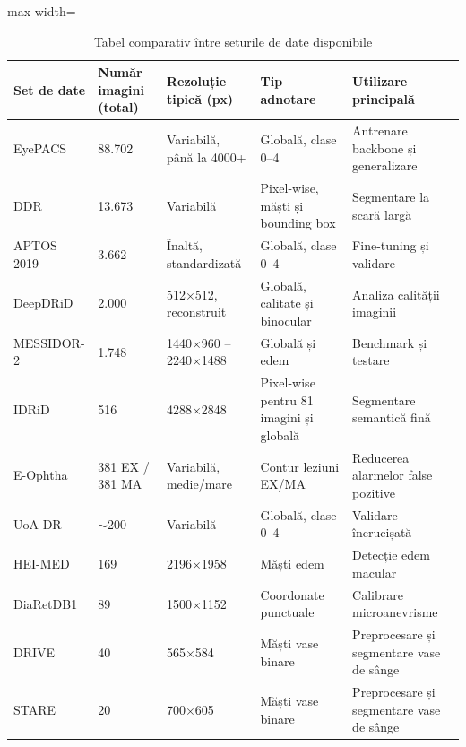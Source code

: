 \documentclass[12pt, a4paper, twoside, romanian]{teza-upb}
\begin{document}
\begin{itemize}
\begin{itemize}
            \begin{table}[H]
            \centering
            \small
            \caption{Tabel comparativ între seturile de date disponibile}
            \label{tab:datasets-comparativ}
            \begin{adjustbox}{max width=\textwidth}
            \begin{tabular}{|p{2.6cm}|p{2.3cm}|p{3cm}|p{3.8cm}|p{4cm}|}
            \hline
            \textbf{Set de date} & \textbf{Număr imagini (total)} & \textbf{Rezoluție tipică (px)} & \textbf{Tip adnotare} & \textbf{Utilizare principală} \\
            \hline
            EyePACS & 88.702 & Variabilă, până la 4000+ & Globală, clase 0--4 & Antrenare backbone și generalizare \\
            \hline
            DDR & 13.673 & Variabilă & Pixel-wise, măști și bounding box & Segmentare la scară largă \\
            \hline
            APTOS 2019 & 3.662 & Înaltă, standardizată & Globală, clase 0--4 & Fine-tuning și validare \\
            \hline
            DeepDRiD & 2.000 & 512$\times$512, reconstruit & Globală, calitate și binocular & Analiza calității imaginii \\
            \hline
            MESSIDOR-2 & 1.748 & 1440$\times$960 -- 2240$\times$1488 & Globală și edem & Benchmark și testare \\
            \hline
            IDRiD & 516 & 4288$\times$2848 & Pixel-wise pentru 81 imagini și globală & Segmentare semantică fină \\
            \hline
            E-Ophtha & 381 EX / 381 MA & Variabilă, medie/mare & Contur leziuni EX/MA & Reducerea alarmelor false pozitive \\
            \hline
            UoA-DR & $\sim$200 & Variabilă & Globală, clase 0--4 & Validare încrucișată \\
            \hline
            HEI-MED & 169 & 2196$\times$1958 & Măști edem & Detecție edem macular \\
            \hline
            DiaRetDB1 & 89 & 1500$\times$1152 & Coordonate punctuale & Calibrare microanevrisme \\
            \hline
            DRIVE & 40 & 565$\times$584 & Măști vase binare & Preprocesare și segmentare vase de sânge \\
            \hline
            STARE & 20 & 700$\times$605 & Măști vase binare & Preprocesare și segmentare vase de sânge \\
            \hline
            \end{tabular}
            \end{adjustbox}
            \end{table}

        \end{itemize}
\end{itemize}
\end{document}

